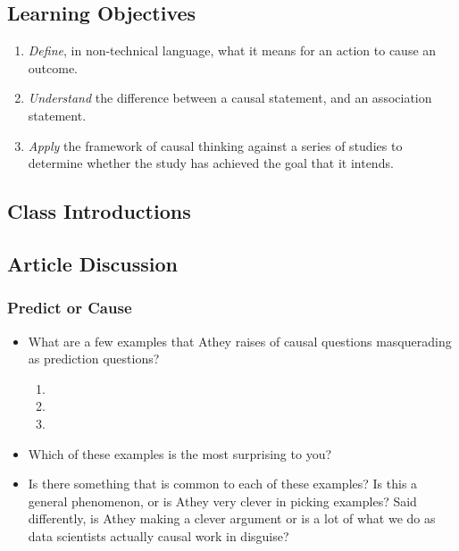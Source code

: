 \documentclass[
]{article}
\providecommand{\tightlist}{%
  \setlength{\itemsep}{0pt}\setlength{\parskip}{0pt}}
\theoremstyle{definition}
\theoremstyle{definition}
\theoremstyle{definition}
\theoremstyle{definition}
\theoremstyle{remark}
\begin{document}
\subsection{Learning Objectives}\label{learning-objectives-1}

\begin{enumerate}
\def\labelenumi{\arabic{enumi}.}
\tightlist
\item
  \emph{Define}, in non-technical language, what it means for an action to cause an outcome.
\item
  \emph{Understand} the difference between a causal statement, and an association statement.
\item
  \emph{Apply} the framework of causal thinking against a series of studies to determine whether the study has achieved the goal that it intends.
\end{enumerate}

\subsection{Class Introductions}\label{class-introductions}

\subsection{Article Discussion}\label{article-discussion}

\subsubsection{Predict or Cause}\label{predict-or-cause}

\begin{itemize}
\tightlist
\item
  What are a few examples that Athey raises of causal questions masquerading as prediction questions?

  \begin{enumerate}
  \def\labelenumi{\arabic{enumi}.}
  \tightlist
  \item
  \item
  \item
  \end{enumerate}
\item
  Which of these examples is the most surprising to you?
\item
  Is there something that is common to each of these examples? Is this a general phenomenon, or is Athey very clever in picking examples? Said differently, is Athey making a clever argument or is a lot of what we do as data scientists actually causal work in disguise?
\end{itemize}
\end{document}
